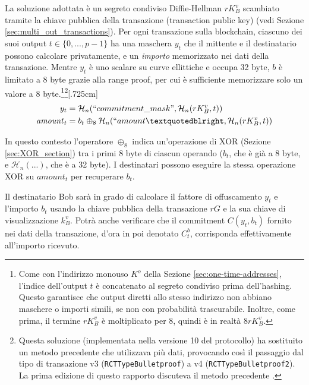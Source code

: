 La soluzione adottata è un segreto condiviso Diffie-Hellman $r K_B^v$ scambiato tramite la chiave pubblica della transazione (transaction public key) (vedi Sezione \ref{sec:multi_out_transactions}). Per ogni transazione sulla blockchain, ciascuno dei suoi output $t \in \{0, ..., p-1\}$ ha una maschera $y_t$ che il mittente e il destinatario possono calcolare privatamente, e un {\em importo} memorizzato nei dati della transazione. Mentre $y_t$ è uno scalare su curve ellittiche e occupa 32 byte, $b$ è limitato a 8 byte grazie alla range proof, per cui è sufficiente memorizzare solo un valore a 8 byte.\footnote{Come con l'indirizzo monouso $K^o$ della Sezione \ref{sec:one-time-addresses}, l'indice dell'output $t$ è concatenato al segreto condiviso prima dell'hashing. Questo garantisce che output diretti allo stesso indirizzo non abbiano maschere o importi simili, se non con probabilità trascurabile. Inoltre, come prima, il termine $r K^v_B$ è moltiplicato per 8, quindi è in realtà $8rK^v_B.$}\footnote{Questa soluzione (implementata nella versione 10 del protocollo) ha sostituito un metodo precedente che utilizzava più dati, provocando così il passaggio dal tipo di transazione v3 ({\tt RCTTypeBulletproof}) a v4 ({\tt RCTTypeBulletproof2}). La prima edizione di questo rapporto discuteva il metodo precedente \cite{ztm-1}.}[.725cm]\vspace{.175cm}
\begin{align*}
  y_t &= \mathcal{H}_n(``commitment\_mask",\mathcal{H}_n(r K_B^v, t)) \\
  \mathit{amount}_t &= b_t \oplus_8 \mathcal{H}_n(``amount”, \mathcal{H}_n(r K_B^v, t))
\end{align*}

In questo contesto l'operatore $\oplus_8$ indica un'operazione di XOR (Sezione \ref{sec:XOR_section}) tra i primi 8 byte di ciascun operando ($b_t$, che è già a 8 byte, e $\mathcal{H}_n(...)$, che è a 32 byte). I destinatari possono eseguire la stessa operazione XOR su $\mathit{amount}_t$ per recuperare $b_t$.

Il destinatario Bob sarà in grado di calcolare il fattore di offuscamento $y_t$ e l’importo $b_t$ usando la chiave pubblica della transazione $r G$ e la sua chiave di visualizzazione $k_B^v$. Potrà anche verificare che il commitment $C(y_t, b_t)$ fornito nei dati della transazione, d’ora in poi denotato $C_t^b$, corrisponda effettivamente all’importo ricevuto.\\

